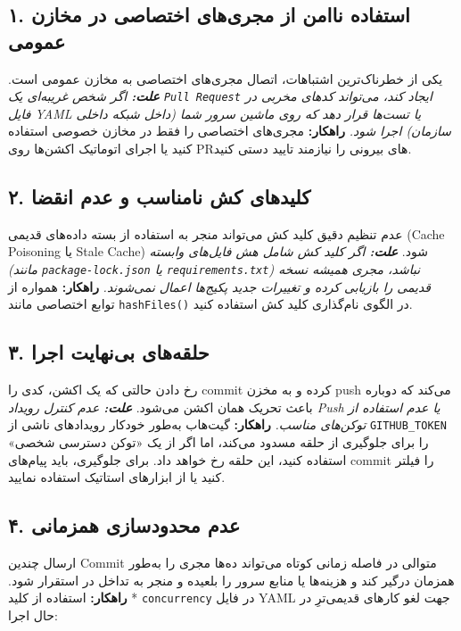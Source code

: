 \documentclass[12pt,a4paper,openany]{book}
\begin{document}
\subsection{۱. استفاده ناامن از مجری‌های اختصاصی در مخازن عمومی}

یکی از خطرناک‌ترین اشتباهات، اتصال مجری‌های اختصاصی  به مخازن عمومی  است. \textit{ \textbf{علت:} اگر شخص غریبه‌ای یک \texttt{Pull Request} ایجاد کند، می‌تواند کدهای مخربی در فایل YAML یا تست‌ها قرار دهد که روی ماشین سرور شما (داخل شبکه داخلی سازمان) اجرا شود. } \textbf{راهکار:} مجری‌های اختصاصی را فقط در مخازن خصوصی  استفاده کنید یا اجرای اتوماتیک اکشن‌ها روی PRهای بیرونی را نیازمند تایید دستی  کنید.

\subsection{۲. کلیدهای کش نامناسب و عدم انقضا}

عدم تنظیم دقیق کلید کش  می‌تواند منجر به استفاده از بسته داده‌های قدیمی (Cache Poisoning یا Stale Cache) شود. \textit{ \textbf{علت:} اگر کلید کش شامل هش فایل‌های وابسته (مانند \texttt{package-lock.json} یا \texttt{requirements.txt}) نباشد، مجری همیشه نسخه قدیمی را بازیابی کرده و تغییرات جدید پکیج‌ها اعمال نمی‌شوند. } \textbf{راهکار:} همواره از توابع اختصاصی مانند \texttt{hashFiles()} در الگوی نام‌گذاری کلید کش استفاده کنید.

\subsection{۳. حلقه‌های بی‌نهایت اجرا }

رخ دادن حالتی که یک اکشن، کدی را commit کرده و به مخزن push می‌کند که دوباره باعث تحریک همان اکشن می‌شود. \textit{ \textbf{علت:} عدم کنترل رویداد Push یا عدم استفاده از توکن‌های مناسب. } \textbf{راهکار:} گیت‌هاب به‌طور خودکار رویدادهای ناشی از \texttt{GITHUB\_TOKEN} را برای جلوگیری از حلقه مسدود می‌کند، اما اگر از یک «توکن دسترسی شخصی»  استفاده کنید، این حلقه رخ خواهد داد. برای جلوگیری، باید پیام‌های commit را فیلتر کنید یا از ابزارهای استاتیک استفاده نمایید.

\subsection{۴. عدم محدودسازی همزمانی }

ارسال چندین Commit متوالی در فاصله زمانی کوتاه می‌تواند ده‌ها مجری را به‌طور همزمان درگیر کند و هزینه‌ها یا منابع سرور را بلعیده و منجر به تداخل در استقرار شود. * \textbf{راهکار:} استفاده از کلید \texttt{concurrency} در فایل YAML جهت لغو کارهای قدیمی‌ترِ در حال اجرا:
\end{document}
